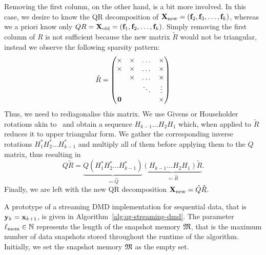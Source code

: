 Removing the first column, on the other hand, is a bit more involved. In this case, we desire to know the QR decomposition of $\mathbf{X}_\text{new} = (\mathbf{f}_2, \mathbf{f}_3, \dots, \mathbf{f}_k)$, whereas we a priori know only $Q R = \mathbf{X}_\text{old} = (\mathbf{f}_1, \mathbf{f}_2, \dots, \mathbf{f}_k)$. Simply removing the first column of $R$ is not sufficient because the new matrix $\tilde{R}$ would not be triangular, instead we observe the following sparsity pattern:
\begin{equation*}
    \tilde{R} = \begin{pmatrix}
        \times & \times & \dots & \times \\
        \times & \times & \dots & \times \\
         & \times & \dots & \times \\
         & & \ddots & \vdots \\
        \mathbf{0} & & & \times \\
    \end{pmatrix}
\end{equation*}
Thus, we need to rediagonalise this matrix. We use Givens or Householder rotations akin to~\cite{Daniel1976} and obtain a sequence $H_{k - 1} \dots H_2 H_1$ which, when applied to $\tilde{R}$ reduces it to upper triangular form. We gather the corresponding inverse rotations $H_1^* H_2^* \dots H_{k - 1}^*$ and multiply all of them before applying them to the $Q$ matrix, thus resulting in
\begin{equation*}
    Q \tilde{R} = \underbrace{Q (H_1^* H_2^* \dots H_{k - 1}^*)}_{\eqqcolon \hat{Q}} \underbrace{(H_{k - 1} \dots H_2 H_1) \tilde{R}}_{\eqqcolon \hat{R}}.
\end{equation*}
Finally, we are left with the new QR decomposition $\mathbf{X}_\text{new} = \hat{Q} \hat{R}$.

A prototype of a streaming DMD implementation for sequential data, that is $\mathbf{y}_k = \mathbf{x}_{k + 1}$, is given in Algorithm~\ref{alg:qr-streaming-dmd}. The parameter $\ell_\text{mem} \in \mathbb{N}$ represents the length of the snapshot memory $\mathfrak{M}$, that is the maximum number of data snapshots stored throughout the runtime of the algorithm. Initially, we set the snapshot memory $\mathfrak{M}$ as the empty set.


